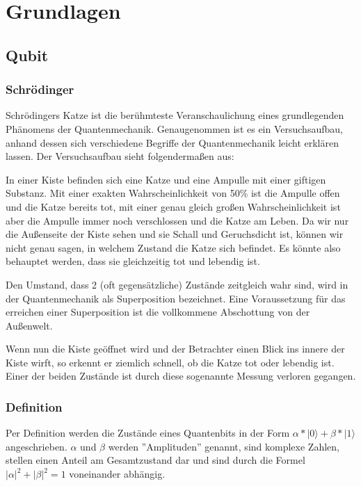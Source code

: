 
\section{Grundlagen}
\label{sec:grundlagen}

\subsection{Qubit}
\label{sec:qubit}

\subsubsection{Schrödinger}
\label{sec:schrodinger}

Schrödingers Katze ist die berühmteste Veranschaulichung eines grundlegenden Phänomens der Quantenmechanik. Genaugenommen ist es ein Versuchsaufbau, anhand dessen sich verschiedene Begriffe der Quantenmechanik leicht erklären lassen. Der Versuchsaufbau sieht folgendermaßen aus:

In einer Kiste befinden sich eine Katze und eine Ampulle mit einer giftigen Substanz. Mit einer exakten Wahrscheinlichkeit von 50\% ist die Ampulle offen und die Katze bereits tot, mit einer genau gleich großen Wahrscheinlichkeit ist aber die Ampulle immer noch verschlossen und die Katze am Leben. Da wir nur die Außenseite der Kiste sehen und sie Schall und Geruchsdicht ist, können wir nicht genau sagen, in welchem Zustand die Katze sich befindet. Es könnte also behauptet werden, dass sie gleichzeitig tot und lebendig ist.

Den Umstand, dass 2 (oft gegensätzliche) Zustände zeitgleich wahr sind, wird in der Quantenmechanik als Superposition bezeichnet. Eine Voraussetzung für das erreichen einer Superposition ist die vollkommene Abschottung von der Außenwelt. 

Wenn nun die Kiste geöffnet wird und der Betrachter einen Blick ins innere der Kiste wirft, so erkennt er ziemlich schnell, ob die Katze tot oder lebendig ist. Einer der beiden Zustände ist durch diese sogenannte Messung verloren gegangen.


\subsubsection{Definition}
\label{sec:Qubit_Definition}

Per Definition werden die Zustände eines Quantenbits in der Form $\alpha * |0\rangle + \beta * |1\rangle$ angeschrieben.
$\alpha$ und $\beta$ werden ''Amplituden'' genannt, sind komplexe Zahlen, stellen einen Anteil am Gesamtzustand dar und sind durch die Formel $|\alpha|^2 + |\beta|^2 = 1$ voneinander abhängig.

